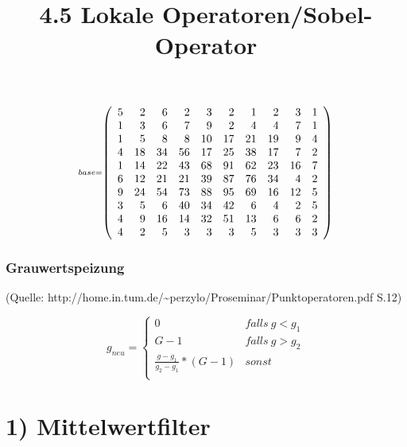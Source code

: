 \documentclass[11pt]{article}
\title{4.5 Lokale Operatoren/Sobel-Operator}
\begin{document}
    

    \maketitle
    
    
    \[\scriptstyle base =  \def\g{\color{lightgray}}\left(\begin{array}{rrrrrrrrrr}5 & 2 & 6 & 2 & 3 & 2 & 1 & 2 & 3 & 1\\1 & 3 & 6 & 7 & 9 & 2 & 4 & 4 & 7 & 1\\1 & 5 & 8 & 8 & 10 & 17 & 21 & 19 & 9 & 4\\4 & 18 & 34 & 56 & 17 & 25 & 38 & 17 & 7 & 2\\1 & 14 & 22 & 43 & 68 & 91 & 62 & 23 & 16 & 7\\6 & 12 & 21 & 21 & 39 & 87 & 76 & 34 & 4 & 2\\9 & 24 & 54 & 73 & 88 & 95 & 69 & 16 & 12 & 5\\3 & 5 & 6 & 40 & 34 & 42 & 6 & 4 & 2 & 5\\4 & 9 & 16 & 14 & 32 & 51 & 13 & 6 & 6 & 2\\4 & 2 & 5 & 3 & 3 & 3 & 5 & 3 & 3 & 3\end{array}\right)\]

    
    \hypertarget{grauwertspeizung}{%
\subsubsection*{Grauwertspeizung}\label{grauwertspeizung}}

(Quelle:
http://home.in.tum.de/\textasciitilde{}perzylo/Proseminar/Punktoperatoren.pdf
S.12)

    \[ g_{neu} = \begin{cases}
                    0 & falls\:g < g_1  \\
                    G - 1 & falls\:g > g_2 \\
                    \frac{g-g_1}{g_2-g_1}*(G-1) & sonst\\
                 \end{cases} \]

    
    \hypertarget{mittelwertfilter}{%
\section*{1) Mittelwertfilter}\label{mittelwertfilter}}
\end{document}
